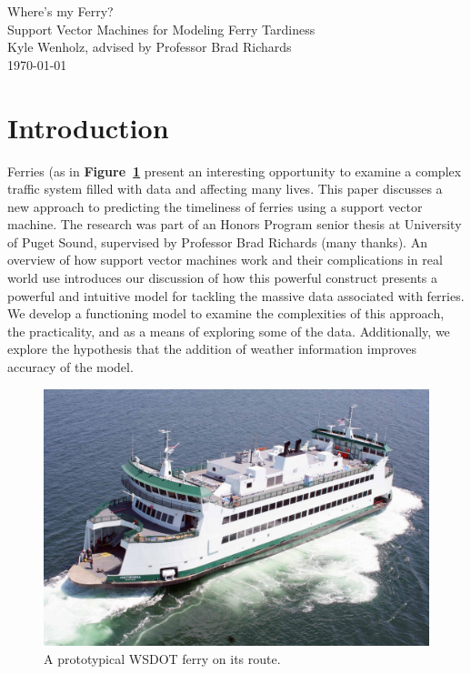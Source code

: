 \documentclass[11pt]{article} %
\begin{document}
\begin{titlepage}
    \vspace*{\fill}
    \begin{center}
      \Huge{Where's my Ferry?}\\[0.5cm]
      \Large{Support Vector Machines for Modeling Ferry Tardiness}\\[0.4cm]
      Kyle Wenholz, advised by Professor Brad Richards\\
      \today
    \end{center}
    \vspace*{\fill}
  \end{titlepage}
\newpage
\vspace*{\fill}
\tableofcontents
\vspace*{\fill}
\newpage


\section{Introduction}
\label{sec:intro}
Ferries (as in \textbf{Figure~\ref{fig:basicferry}} present an interesting 
opportunity to examine a complex traffic system filled with data and affecting 
many lives. This paper discusses a new approach to predicting 
the timeliness of ferries using a support vector machine. The research was part
of an Honors Program senior thesis at University of Puget Sound, supervised by 
Professor Brad Richards (many thanks). An overview of how 
support vector machines work and their complications in real world use 
introduces our discussion of how this powerful construct presents a powerful and 
intuitive model for tackling the massive data associated with ferries. We
develop a functioning model to examine the complexities of this
approach, the practicality, and as a means of exploring some of the data. 
Additionally, we explore the hypothesis that the addition of weather information 
improves accuracy of the model.

\begin{figure}[h]
  \centering
  \includegraphics[scale=.15]{images/ferry.jpg}
  \caption{A prototypical WSDOT ferry on its route.}
  \label{fig:basicferry}
\end{figure}
\end{document}
